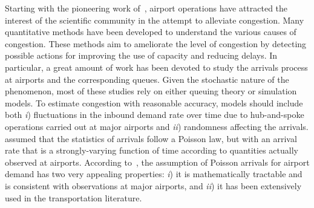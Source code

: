 \documentclass[draft,review]{elsarticle}
\begin{document}
Starting with the pioneering work of~\citet{Blum1959}, airport operations have attracted the interest of the scientific community in the attempt to alleviate congestion.
Many quantitative methods have been developed to understand the various causes of congestion.
These methods aim to ameliorate the level of congestion by detecting possible actions for improving the use of capacity and reducing delays.
In particular, a great amount of work has been devoted to study the arrivals process at airports and the corresponding queues.
Given the stochastic nature of the phenomenon, most of these studies rely on either queuing theory or simulation models. To  estimate congestion with reasonable accuracy, models should include both \emph{i}) fluctuations in the inbound demand rate over time due to hub-and-spoke operations carried out at major airports and \emph{ii}) randomness affecting the arrivals. \citeauthor{Koop1972} assumed that the statistics of arrivals follow a Poisson law, but with an arrival rate that is a strongly-varying function of time according to quantities actually observed at airports.
According to~\citet{HO1975}, the assumption of Poisson arrivals for airport demand has two very appealing properties:
\emph{i}) it is mathematically tractable and is consistent with observations at major airports, and
\emph{ii}) it has been extensively used in the transportation literature.
\end{document}
